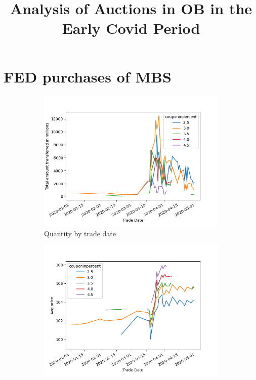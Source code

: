 \documentclass[11pt,a4paper]{article}
\begin{document}
\title{Analysis of Auctions in OB in the Early Covid Period}

\maketitle



\section{FED purchases of MBS}

\begin{figure}[h]
    \centering
    \begin{subfigure}[b]{0.49\textwidth}
      \includegraphics[width=0.998\textwidth]{../results/figures/FNMA_daily_purchases_tradedate_amount.png}
      \caption{ Quantity by trade date}
     \end{subfigure}
     \begin{subfigure}[b]{0.49\textwidth}
      \includegraphics[width=0.998\textwidth]{../results/figures/FNMA_daily_purchases_tradedate_price.png}

\end{subfigure}
\end{figure}
\end{document}
